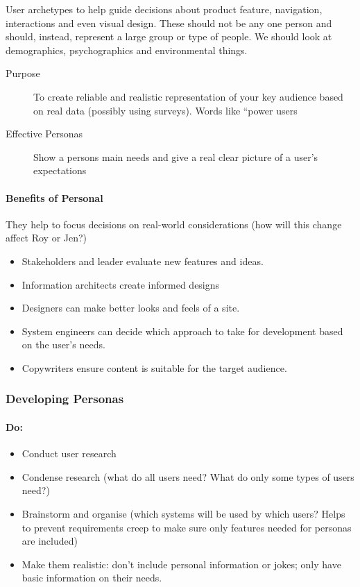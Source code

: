 User archetypes to help guide decisions about product feature, navigation, interactions and even visual design.
These should not be any one person and should, instead, represent a large group or type of people.
We should look at demographics, psychographics and environmental things.

\begin{description}
	\item[Purpose] To create reliable and realistic representation of your key audience based on real data (possibly using surveys).
	      Words like ``power users
	\item[Effective Personas] Show a persons main needs and give a real clear picture of a user's expectations
\end{description}

\paragraph{Benefits of Personal}\label{par:benefits_of_personal}

They help to focus decisions on real-world considerations (how will this change affect Roy or Jen?)

\begin{itemize}
	\item Stakeholders and leader evaluate new features and ideas.
	\item Information architects create informed designs
	\item Designers can make better looks and feels of a site.
	\item System engineers can decide which approach to take for development based on the user's needs.
	\item Copywriters ensure content is suitable for the target audience.
\end{itemize}

\subsubsection{Developing Personas}\label{ssub:developing_personas}

\paragraph{Do:}\label{par:do_}

\begin{itemize}
	\item Conduct user research
	\item Condense research (what do all users need? What do only some types of users need?)
	\item Brainstorm and organise (which systems will be used by which users? Helps to prevent requirements creep to make sure only features needed for personas are included)
	\item Make them realistic: don't include personal information or jokes; only have basic information on their needs.
\end{itemize}


